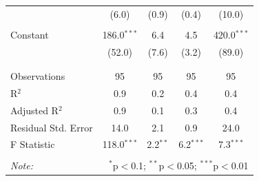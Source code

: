 \documentclass[12pt, a4paper]{article}
\begin{document}
\begin{table}[!htbp]
\begin{tabular}{@{\extracolsep{5pt}}lcccc}
  & (6.0) & (0.9) & (0.4) & (10.0) \\ 
  & & & & \\ 
 Constant & 186.0$^{***}$ & 6.4 & 4.5 & 420.0$^{***}$ \\ 
  & (52.0) & (7.6) & (3.2) & (89.0) \\ 
  & & & & \\ 
\hline \\[-1.8ex] 
Observations & 95 & 95 & 95 & 95 \\ 
R$^{2}$ & 0.9 & 0.2 & 0.4 & 0.4 \\ 
Adjusted R$^{2}$ & 0.9 & 0.1 & 0.3 & 0.4 \\ 
Residual Std. Error & 14.0 & 2.1 & 0.9 & 24.0 \\ 
F Statistic & 118.0$^{***}$ & 2.2$^{**}$ & 6.2$^{***}$ & 7.3$^{***}$ \\ 
\hline 
\hline \\[-1.8ex] 
\textit{Note:}  & \multicolumn{4}{r}{$^{*}$p$<$0.1; $^{**}$p$<$0.05; $^{***}$p$<$0.01} \\ 
\end{tabular} 
\end{table} \clearpage
\begin{landscape}
\end{landscape}
\end{document}
